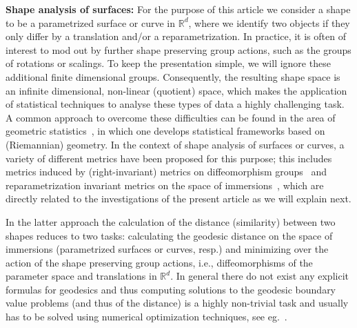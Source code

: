 \documentclass[final,hidelinks,onefignum,onetabnum]{siamart220329}
\begin{document}
{\bf Shape analysis of surfaces:} For the purpose of this article we consider a shape to be a parametrized surface or curve in $\mathbb{R}^d$, where we identify two objects if they only differ by a translation and/or a reparametrization. In practice, it is often of interest to mod out by further shape preserving group actions, such as the groups of rotations or scalings. To keep the presentation simple, we will ignore these additional finite dimensional groups.
Consequently, the resulting shape space is an infinite dimensional, non-linear (quotient) space, which makes the application of statistical techniques to analyse these types of data a highly challenging task. A common approach to overcome these difficulties can be found in the area of geometric statistics~\cite{pennec2006intrinsic,pennec2019riemannian}, in which one develops statistical frameworks based on (Riemannian) geometry. In the context of shape analysis of surfaces or curves, a variety of different metrics have been proposed for this purpose; this includes metrics induced by (right-invariant) metrics on diffeomorphism groups~\cite{younes2010shapes,miller2002metrics} and reparametrization invariant metrics on the space of immersions~\cite{srivastava2016functional,bauer2014overview,michor2007overview}, which are directly related to the investigations of the present article as we will explain next.  

In the latter approach the calculation of the distance (similarity) between two shapes reduces to two tasks: calculating the geodesic distance on the space of immersions (parametrized surfaces or curves, resp.) and minimizing over the action of the shape preserving group actions, i.e., diffeomorphisms of the parameter space and translations in $\mathbb R^d$. In general there do not exist any explicit formulas for geodesics and thus computing solutions to the geodesic boundary value problems (and thus of the distance) is a highly non-trivial task and usually has to be solved using numerical optimization techniques, see eg.~\cite{hartman2022elastic,bauer2017numerical}. 
\end{document}
